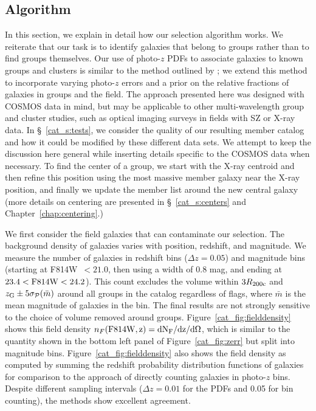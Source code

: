 \subsection{Algorithm}
 
In this section, we explain in detail how our selection algorithm
works. We reiterate that our task is to identify galaxies that belong
to groups rather than to find groups themselves. Our use of photo-$z$
PDFs to associate galaxies to known groups and clusters is similar to
the method outlined by \citet{Brunner2000}; we extend this method to
incorporate varying photo-$z$ errors and a prior on the relative
fractions of galaxies in groups and the field. The approach presented
here was designed with COSMOS data in mind, but may be applicable to
other multi-wavelength group and cluster studies, such as optical
imaging surveys in fields with SZ or X-ray data. In
\S~\ref{cat_s:tests}, we consider the quality of our resulting member
catalog and how it could be modified by these different data sets. We
attempt to keep the discussion here general while inserting details
specific to the COSMOS data when necessary. To find the center of a group, we
start with the X-ray centroid and then refine this position using
the most massive member galaxy near the X-ray position, and finally we
update the member list around the new central galaxy (more details on centering are
presented in \S~\ref{cat_s:centers} and Chapter~\ref{chap:centering}.)

We first consider the field galaxies that can contaminate our selection.
The background density of galaxies varies with position, redshift, and
magnitude. We measure the number of galaxies in redshift bins
($\Delta z=0.05$) and magnitude bins (starting at F814W~$<21.0$, then
using a width of 0.8 mag, and ending at $23.4<\rm{F814W}<24.2$). This count excludes
the volume within $3\mbox{$R_{200\rm{c}}$}{}$ and $z_{\rm{G}}\pm 5\sigma_{\mathcal{P}}(\bar{m})$
around all groups in the catalog regardless of flags,
where $\bar{m}$ is the mean magnitude of galaxies in the bin. The
final results are not strongly sensitive to the choice of volume removed around
groups. Figure~\ref{cat_fig:fielddensity} shows this field density
$n_F(\rm{F814W},z)=dN_F/dz/d\Omega$, which is similar to the quantity
shown in the bottom left panel of Figure~\ref{cat_fig:zerr} but split
into magnitude bins. Figure~\ref{cat_fig:fielddensity} also shows the
field density as computed by summing the redshift probability
distribution functions of galaxies for comparison to the approach of
directly counting galaxies in photo-$z$ bins. Despite different sampling
intervals ($\Delta z=0.01$ for the PDFs and 0.05 for bin counting),
the methods show excellent agreement.

